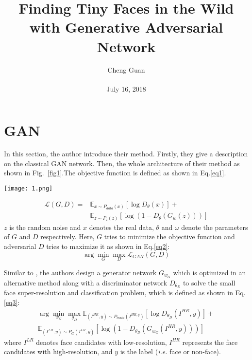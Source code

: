 \documentclass[10pt,twocolumn,letterpaper]{article}
\title{Finding Tiny Faces in the Wild with Generative Adversarial Network}
\author{Cheng Guan\\\\
July 16, 2018}
\begin{document}
\maketitle
\section{GAN}
In this section, the author introduce their method. Firstly, they give a description on the classical GAN
network. Then, the whole architecture of their method as shown in Fig.~\ref{fig1}.The objective function is defined as shown in Eq.\ref{eq1}.
%
\begin{figure*}[hb]
	\centering
	\texttt{[image: 1.png]}
	\caption{The pipeline of the proposed tiny face detector system.}
	\label{fig1}
\end{figure*}
%
\begin{equation}
\begin{aligned}
\mathcal{L}\left(G,D\right) = &\mathbb{E}_{x\sim P_{data}\left(x\right)} \left[\log D_\theta \left(x\right)\right]+\\
&\mathbb{E}_{z\sim P_{z}\left(z\right)}\left[\log\left(1-D_\theta\left(G_w\left(z\right)\right)\right)\right]
\end{aligned}
\label{eq1}
\end{equation}
%
$z$ is the random noise and $x$ denotes the real data, $θ$
and $ω$ denote the parameters of $G$ and $D$ respectively. Here,
$G$ tries to minimize the objective function and adversarial $D$
tries to maximize it as shown in Eq.\ref{eq2}:
\begin{equation}
\arg \min_G \max_D \mathcal{L}_{GAN}\left(G,D\right)
\label{eq2}
\end{equation}
%
\par
Similar to \cite{goodfellow2014generative}, the authors design a generator network 
$G_{w_G}$ which is optimized in an alternative method along 
with a discriminator network $D_{\theta_D}$ to solve the small
face super-resolution and classification problem, which is
defined as shown in Eq.\ref{eq3}:
\begin{equation}
\begin{aligned}
\arg \min_{w_G} \max_{\theta_D} \mathbb{E}_{\left(I^{HR},y\right)\sim
P_{train}\left(I^{HR,y}\right)}\left[\log D_{\theta_D}\left(I^{HR},y\right)\right]+\\
\mathbb{E}_{\left(I^{LR},y\right)\sim
	P_{G}\left(I^{LR},y\right)}\left[\log\left(1- D_{\theta_D}\left(G_{w_G}\left(I^{HR},y\right)\right)\right)\right]
\end{aligned}
\label{eq3}
\end{equation}
where $I^{LR}$ denotes face candidates with low-resolution,
$I^{HR}$ represents the face candidates with high-resolution,
and $y$ is the label (\textit{i.e.} face or non-face).
%
\end{document}

